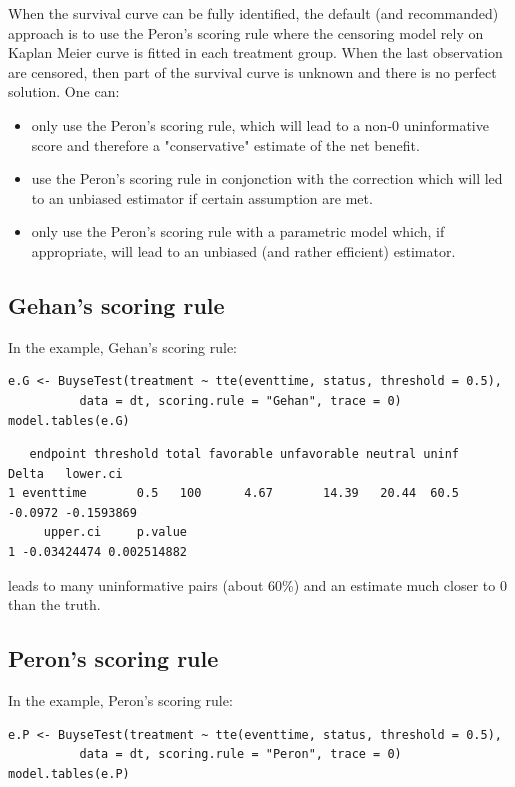 \documentclass[12pt]{article}
\begin{document}
When the survival curve can be fully identified, the default (and
recommanded) approach is to use the Peron's scoring rule where the
censoring model rely on Kaplan Meier curve is fitted in each treatment
group. When the last observation are censored, then part of the
survival curve is unknown and there is no perfect solution. One can:
\begin{itemize}
\item only use the Peron's scoring rule, which will lead to a non-0
uninformative score and therefore a "conservative" estimate of the net benefit.
\item use the Peron's scoring rule in conjonction with the correction
which will led to an unbiased estimator if certain assumption are met.
\item only use the Peron's scoring rule with a parametric model which, if
appropriate, will lead to an unbiased (and rather efficient)
estimator.
\end{itemize}

\subsection{Gehan's scoring rule}
\label{sec:org37ce495}
In the example, Gehan's scoring rule:
\lstset{language=r,label= ,caption= ,captionpos=b,numbers=none}
\begin{lstlisting}
e.G <- BuyseTest(treatment ~ tte(eventtime, status, threshold = 0.5),
          data = dt, scoring.rule = "Gehan", trace = 0)
model.tables(e.G)
\end{lstlisting}

\begin{verbatim}
   endpoint threshold total favorable unfavorable neutral uninf   Delta   lower.ci
1 eventtime       0.5   100      4.67       14.39   20.44  60.5 -0.0972 -0.1593869
     upper.ci     p.value
1 -0.03424474 0.002514882
\end{verbatim}


leads to many uninformative pairs (about 60\%) and an estimate much
closer to 0 than the truth.

\subsection{Peron's scoring rule}
\label{sec:org5b6cec2}
In the example, Peron's scoring rule:
\lstset{language=r,label= ,caption= ,captionpos=b,numbers=none}
\begin{lstlisting}
e.P <- BuyseTest(treatment ~ tte(eventtime, status, threshold = 0.5),
          data = dt, scoring.rule = "Peron", trace = 0)
model.tables(e.P)
\end{lstlisting}
\end{document}
